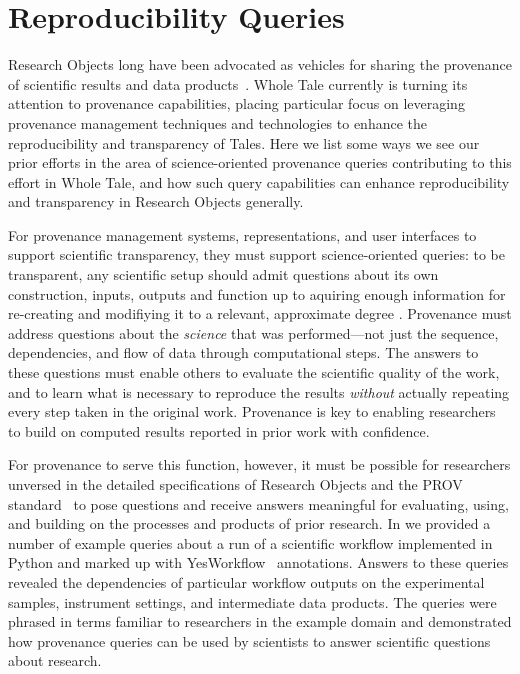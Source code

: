 \section{Reproducibility Queries}\label{sec-transparency}

Research Objects long have been advocated as vehicles for sharing the
	provenance of scientific results and data products~\cite{bechhofer2013whya}.
Whole Tale currently is turning its attention to provenance capabilities, placing particular
	focus on leveraging provenance management techniques and technologies
	to enhance the reproducibility and transparency of Tales.
Here we list some ways we see our prior efforts in the area
	of science-oriented provenance queries contributing to this effort in Whole Tale,
	and how such query capabilities can enhance reproducibility and transparency in
	Research Objects generally.

For provenance management systems, representations, and user interfaces to support
	scientific transparency, they must support science-oriented queries: to be transparent,
    any scientific setup should admit questions about its own construction, inputs, outputs
    and function up to aquiring enough information for re-creating and modifiying it to a
    relevant, approximate degree \cite{resnick2000beyond}.
Provenance must address questions about the \emph{science} that was performed---not just the
	sequence, dependencies, and flow of data through computational steps.
The answers to these questions must enable others to evaluate the scientific quality of the work,
	and to learn what is necessary to
	reproduce the results \emph{without} actually repeating every step taken in the original work.
Provenance is key to enabling researchers to build on computed results reported in prior work with confidence.

For provenance to serve this function, however, it must be possible for researchers unversed in the detailed
	specifications of Research Objects and the PROV standard~\cite{groth2013provoverviewa} to pose
	questions and receive answers meaningful for evaluating, using, and building on the
	processes and products of prior research.
In \cite{mcphillips2015retrospective} we provided a number of example queries about a run of a scientific
	workflow implemented in Python and marked up with YesWorkflow~\cite{mcphillips2015yesworkflowa} annotations.
Answers to these queries revealed the dependencies of particular workflow outputs
	on the experimental samples, instrument settings, and intermediate data products.
The queries were phrased in terms familiar to researchers  in the example domain
	and demonstrated how provenance queries can be used by scientists
	to answer scientific questions about research.

